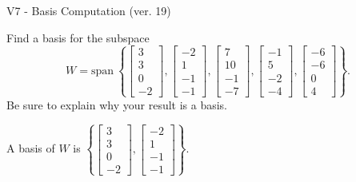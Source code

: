 \begin{exercise}
  \begin{exerciseTitle}V7 - Basis Computation (ver. 19)\end{exerciseTitle}
  \begin{exerciseStatement}
    Find a basis for the subspace 
\[W=\mathrm{span}\ \left\{\left[\begin{array}{r}
3 \\
3 \\
0 \\
-2
\end{array}\right] , \left[\begin{array}{r}
-2 \\
1 \\
-1 \\
-1
\end{array}\right] , \left[\begin{array}{r}
7 \\
10 \\
-1 \\
-7
\end{array}\right] , \left[\begin{array}{r}
-1 \\
5 \\
-2 \\
-4
\end{array}\right] , \left[\begin{array}{r}
-6 \\
-6 \\
0 \\
4
\end{array}\right]\right\}.\]
 Be sure to explain why your result is a basis.


  \end{exerciseStatement}
  \begin{exerciseAnswer}
   A basis of \(W\) is  \(\left\{\left[\begin{array}{r}
3 \\
3 \\
0 \\
-2
\end{array}\right] , \left[\begin{array}{r}
-2 \\
1 \\
-1 \\
-1
\end{array}\right]\right\}\).
  


  \end{exerciseAnswer}
\end{exercise}